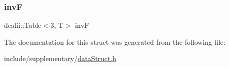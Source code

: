 \mbox{\label{structdeformation_mapwith_grad_ae40deb9e4616ec6d0b77519e56646ce0}} 
\subsubsection{\texorpdfstring{invF}{invF}}
{\footnotesize\ttfamily dealii\+::\+Table$<$3, T$>$ invF}



The documentation for this struct was generated from the following file\+:\begin{DoxyCompactItemize}
\item 
include/supplementary/\mbox{\hyperlink{data_struct_8h}{data\+Struct.\+h}}\end{DoxyCompactItemize}
